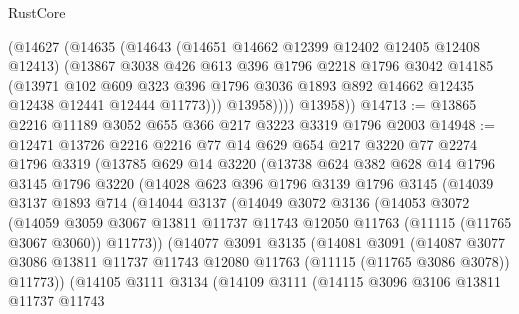 \begin{lexlean}{RustCore}
\begin{coremodule}
            (@14627
              (@14635
                (@14643
                  (@14651 @14662 @12399 @12402 @12405 @12408 @12413)
                  (@13867
                    @3038
                    @426
                    @613
                    @396
                    @1796
                    @2218
                    @1796
                    @3042
                    @14185
                    (@13971
                      @102
                      @609
                      @323
                      @396
                      @1796
                      @3036
                      @1893
                      @892
                      @14662
                      @12435
                      @12438
                      @12441
                      @12444
                      @11773)))
                @13958))))
        @13958))
@14713 := @13865 @2216 @11189 @3052 @655 @366 @217 @3223 @3319 @1796 @2003
@14948 := @12471
    @13726
    @2216
    @2216
    @77
    @14
    @629
    @654
    @217
    @3220
    @77
    @2274
    @1796
    @3319
    (@13785
      @629
      @14
      @3220
      (@13738
        @624
        @382
        @628
        @14
        @1796
        @3145
        @1796
        @3220
        (@14028
          @623
          @396
          @1796
          @3139
          @1796
          @3145
          (@14039
            @3137
            @1893
            @714
            (@14044
              @3137
              (@14049
                @3072
                @3136
                (@14053
                  @3072
                  (@14059
                    @3059
                    @3067
                    @13811
                    @11737
                    @11743
                    @12050
                    @11763
                    (@11115 (@11765 @3067 @3060))
                    @11773))
                (@14077
                  @3091
                  @3135
                  (@14081
                    @3091
                    (@14087
                      @3077
                      @3086
                      @13811
                      @11737
                      @11743
                      @12080
                      @11763
                      (@11115 (@11765 @3086 @3078))
                      @11773))
                  (@14105
                    @3111
                    @3134
                    (@14109
                      @3111
                      (@14115
                        @3096
                        @3106
                        @13811
                        @11737
                        @11743

\end{coremodule}
\end{lexlean}
